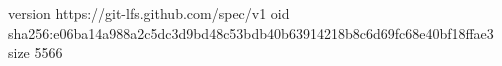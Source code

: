 version https://git-lfs.github.com/spec/v1
oid sha256:e06ba14a988a2c5dc3d9bd48c53bdb40b63914218b8c6d69fc68e40bf18ffae3
size 5566
